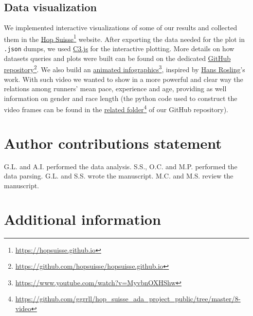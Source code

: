 \documentclass[fleqn,10pt]{wlscirep}
\begin{document}
	
	\subsection*{Data visualization}		
	
		We implemented interactive visualizations of some of our results and collected  them in the   \href{https://hopsuisse.github.io}{Hop Suisse}\footnote{\url{https://hopsuisse.github.io}} website.
		After exporting the data needed for the plot in \texttt{.json} dumps, we used \href{http://c3js.org}{C3.js} for the interactive plotting. More details on how datasets queries and plots were built can be found on the dedicated \href{https://github.com/hopsuisse/hopsuisse.github.io}{GitHub repository}\footnote{\url{https://github.com/hopsuisse/hopsuisse.github.io}}.
		We also build an \href{https://www.youtube.com/watch?v=MyvbnOXHShw}{animated infographics}\footnote{\url{https://www.youtube.com/watch?v=MyvbnOXHShw}}, inspired by  \href{https://en.wikipedia.org/wiki/Hans_Rosling}{Hans Rosling}'s work. With such video we wanted to show in a more powerful and clear way the relations among runners' mean pace, experience and age, providing as well information on gender and race length
		(the python code used to construct the video frames can be found in the \href{https://github.com/ggrrll/hop_suisse_ada_project_public/tree/master/8-video}{related folder}\footnote{\url{https://github.com/ggrrll/hop_suisse_ada_project_public/tree/master/8-video}} of our GitHub repository).
	

%

\section*{Author contributions statement}

G.L. and A.I. performed the data analysis.
S.S., O.C. and M.P. performed the data parsing.
G.L. and S.S. wrote the manuscript.
M.C. and M.S. review the manuscript.

\section*{Additional information}
\end{document}

